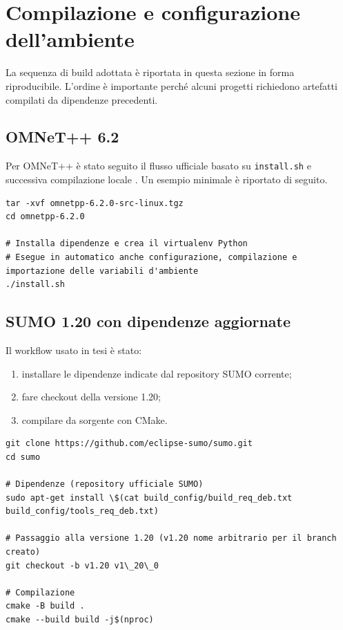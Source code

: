 \section{Compilazione e configurazione dell’ambiente}

La sequenza di build adottata è riportata in questa sezione in forma riproducibile. L’ordine è importante perché alcuni progetti richiedono artefatti compilati da dipendenze precedenti.

\subsection{OMNeT++ 6.2}

Per OMNeT++ è stato seguito il flusso ufficiale basato su \texttt{install.sh} e successiva compilazione locale \cite{omnet_download,omnet_versions}. Un esempio minimale è riportato di seguito.

\begin{lstlisting}[caption={Installazione e build OMNeT++ 6.2},label={lst:omnet_build}]
tar -xvf omnetpp-6.2.0-src-linux.tgz
cd omnetpp-6.2.0

# Installa dipendenze e crea il virtualenv Python
# Esegue in automatico anche configurazione, compilazione e importazione delle variabili d'ambiente
./install.sh
\end{lstlisting}

\subsection{SUMO 1.20 con dipendenze aggiornate}

Il workflow usato in tesi è stato:
\begin{enumerate}
\item installare le dipendenze indicate dal repository SUMO corrente;
\item fare checkout della versione 1.20;
\item compilare da sorgente con CMake.
\end{enumerate}

\begin{lstlisting}[caption={Build SUMO 1.20 con dipendenze dal repository ufficiale},label={lst:sumo_build}]
git clone https://github.com/eclipse-sumo/sumo.git
cd sumo

# Dipendenze (repository ufficiale SUMO)
sudo apt-get install \$(cat build_config/build_req_deb.txt build_config/tools_req_deb.txt)

# Passaggio alla versione 1.20 (v1.20 nome arbitrario per il branch creato)
git checkout -b v1.20 v1\_20\_0

# Compilazione
cmake -B build .
cmake --build build -j$(nproc)

\end{lstlisting}

